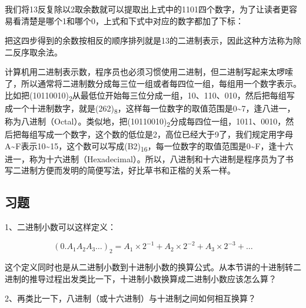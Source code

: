 我们将13反复除以2取余数就可以提取出上式中的1101四个数字，为了让读者更容易看清楚是哪个1和哪个0，上式和下式中对应的数字都加了下标：


\begin{BookLiteral}
\end{BookLiteral}


把这四步得到的余数按相反的顺序排列就是13的二进制表示，因此这种方法称为除二反序取余法。



计算机用二进制表示数，程序员也必须习惯使用二进制，但二进制写起来太啰嗦了，所以通常将二进制数分成每三位一组或者每四位一组，每组用一个数字表示。比如把(10110010)\textsubscript{2}从最低位开始每三位分成一组，10、110、010，然后把每组写成一个十进制数字，就是(262)\textsubscript{8}，这样每一位数字的取值范围是0\textasciitilde{}\BookSplit{}7，逢八进一，称为八进制（Octal）。类似地，把(10110010)\textsubscript{2}分成每四位一组，1011、0010，然后把每组写成一个数字，这个数的低位是2，高位已经大于9了，我们规定用字母A\textasciitilde{}\BookSplit{}F表示10\textasciitilde{}\BookSplit{}15，这个数可以写成(B2)\textsubscript{16}，每一位数字的取值范围是0\textasciitilde{}\BookSplit{}F，逢十六进一，称为十六进制（Hexadecimal）。所以，八进制和十六进制是程序员为了书写二进制方便而发明的简便写法，好比草书和正楷的关系一样。


\subsection*{习题}
%


1、二进制小数可以这样定义：


\[(0.A_{1}A_{2}A_{3}\ldots)_{2}=A_{1}\times2^{-1}+A_{2}\times2^{-2}+A_{3}\times2^{-3}+\ldots\]


这个定义同时也是从二进制小数到十进制小数的换算公式。从本节讲的十进制转二进制的推导过程出发类比一下，十进制小数换算成二进制小数应该怎么算？



2、再类比一下，八进制（或十六进制）与十进制之间如何相互换算？



